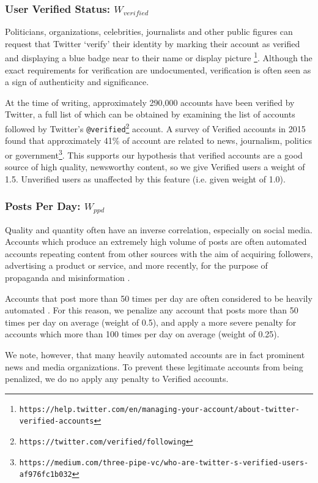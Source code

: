 \subsubsection{User Verified Status: \(W_{verified}\)}
Politicians, organizations, celebrities, journalists and other public figures can request that Twitter `verify' their identity by marking their account as verified and displaying a blue badge near to their name or display picture \footnote{\texttt{https://help.twitter.com/en/managing-your-account/about-twitter-\\verified-accounts}}. Although the exact requirements for verification are undocumented, verification is often seen as a sign of authenticity and significance.

At the time of writing, approximately 290,000 accounts have been verified by Twitter, a full list of which can be obtained by examining the list of accounts followed by Twitter's \texttt{@verified}\footnote{\texttt{https://twitter.com/verified/following}} account. A survey of Verified accounts in 2015 found that approximately 41\% of account are related to news, journalism, politics or government\footnote{\texttt{https://medium.com/three-pipe-vc/who-are-twitter-s-verified-users-\\af976fc1b032}}. This supports our hypothesis that verified accounts are a good source of high quality, newsworthy content, so we give Verified users a weight of 1.5. Unverified users as unaffected by this feature (i.e. given weight of 1.0).

\subsubsection{Posts Per Day: \(W_{ppd}\)}
Quality and quantity often have an inverse correlation, especially on social media.
Accounts which produce an extremely high volume of posts are often automated accounts repeating content from other sources with the aim of acquiring followers, advertising a product or service, and more recently, for the purpose of propaganda and misinformation \citep{Forelle15, Howard16}.

Accounts that post more than 50 times per day are often considered to be heavily automated \citep{Howard16}. For this reason, we penalize any account that posts more than 50 times per day on average (weight of 0.5), and apply a more severe penalty for accounts which more than 100 times per day on average (weight of 0.25).

We note, however, that many heavily automated accounts are in fact prominent news and media organizations. To prevent these legitimate accounts from being penalized, we do no apply any penalty to Verified accounts.

